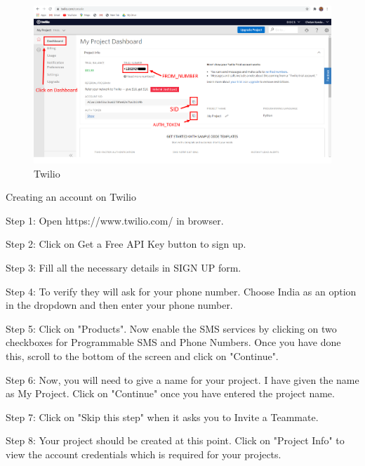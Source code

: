 \vspace{0.4cm}

\begin{figure}[h]
		\centering
	\includegraphics[width=120mm,scale=1]{50}
	\caption{Twilio}
	\label{Twilio}
	
\end{figure}

Creating an account on Twilio

\vspace{0.4cm}

Step 1: Open https://www.twilio.com/  in browser.
\vspace{0.4cm}

Step 2: Click on  Get a Free API Key button to sign up.

\vspace{0.4cm}
Step 3: Fill all the necessary details in SIGN UP form.

\vspace{0.4cm}
Step 4: To verify they will ask for your phone number. Choose India as an option in the dropdown and then enter your phone number.

\vspace{0.4cm}
Step 5: Click on "Products". Now enable the SMS services by clicking on two checkboxes for Programmable SMS and Phone Numbers. Once you have done this, scroll to the bottom of the screen and click on "Continue".

\vspace{0.4cm}
Step 6: Now, you will need to give a name for your project. I have given the name as My Project. Click on "Continue" once you have entered the project name.

\vspace{0.4cm}
Step 7: Click on "Skip this step" when it asks you to Invite a Teammate.

\vspace{0.4cm}
Step 8: Your project should be created at this point. Click on "Project Info" to view the account credentials which is required for your projects.

